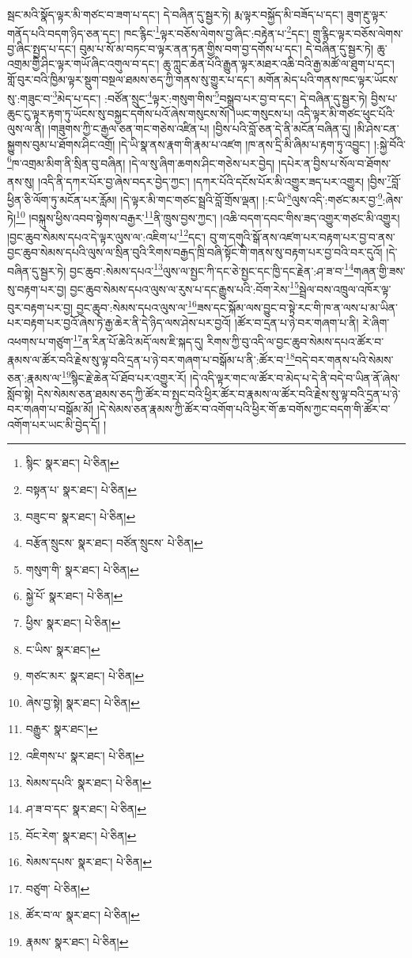 སྦང་མའི་སྣོད་ལྟར་མི་གཙང་བ་ཟག་པ་དང་། དེ་བཞིན་དུ་སྦྱར་ཏེ། རྨ་ལྟར་བསྐྱོད་མི་བཟོད་པ་དང་། ཟུག་རྔུ་ལྟར་གནོད་པའི་བདག་ཉིད་ཅན་དང་། ཁང་རྙིང་\footnote{སྙིང་  སྣར་ཐང་།  པེ་ཅིན། }ལྟར་བཅོས་ལེགས་བྱ་ཞིང་:བརྟེན་པ་\footnote{བསྟན་པ་  སྣར་ཐང་།  པེ་ཅིན། }དང་། གྲུ་རྙིང་ལྟར་བཅོས་ལེགས་བྱ་ཞིང་སྤྱད་པ་དང་། བུམ་པ་སོ་མ་བཏང་བ་ལྟར་ནན་ཏན་གྱིས་བག་བྱ་དགོས་པ་དང་། དེ་བཞིན་དུ་སྦྱར་ཏེ། ཆུ་འགྲམ་གྱི་ཤིང་ལྟར་གཡོ་ཞིང་འགུལ་བ་དང་། ཆུ་ཀླུང་ཆེན་པོའི་རྒྱུན་ལྟར་མཐར་འཆི་བའི་རྒྱ་མཚོ་ལ་ཐུག་པ་དང་། གློ་བུར་བའི་ཁྱིམ་ལྟར་སྡུག་བསྔལ་ཐམས་ཅད་ཀྱི་གནས་སུ་གྱུར་པ་དང་། མགོན་མེད་པའི་གནས་ཁང་ལྟར་ཡོངས་སུ་:གཟུང་བ་\footnote{བཟུང་བ་  སྣར་ཐང་།  པེ་ཅིན། }མེད་པ་དང་། :བཙོན་སྲུང་\footnote{བརྩོན་སྲུངས་  སྣར་ཐང་། བཙོན་སྲུངས་  པེ་ཅིན། }ལྟར་:གསུག་གིས་\footnote{གསུག་གི་  སྣར་ཐང་།  པེ་ཅིན། }བསྒྲུབ་པར་བྱ་བ་དང་། དེ་བཞིན་དུ་སྦྱར་ཏེ། བྱིས་པ་ཆུང་ངུ་ལྟར་རྟག་ཏུ་ཡོངས་སུ་བསྐྱང་དགོས་པའོ་ཞེས་གསུངས་སོ། །ཡང་གསུངས་པ། འདི་ལྟར་མི་གཙང་ཕུང་པོའི་ལུས་ལ་ནི། །གཟུགས་ཀྱི་ང་རྒྱལ་ཅན་གང་གཅེས་འཛིན་པ། །བྱིས་པའི་བློ་ཅན་དེ་ནི་མངོན་བཞིན་དུ། །མི་ཤེས་ངན་སྐྱུགས་བུམ་པ་ཐོགས་ཤིང་འགྲོ། །དེ་ཡི་སྣ་ནས་རྣག་གི་རྣམ་པ་འཛག །ཁ་ནས་དྲི་མི་ཞིམ་པ་རྟག་ཏུ་འབྱུང་། །:སྐྱེ་བོའི་\footnote{སྐྱེ་པོ་  སྣར་ཐང་།  པེ་ཅིན། }ཁ་འགྲམ་མིག་ནི་སྲིན་བུ་བཞིན། །དེ་ལ་སུ་ཞིག་ཆགས་ཤིང་གཅེས་པར་བྱེད། །དཔེར་ན་བྱིས་པ་སོལ་བ་ཐོགས་ནས་སུ། །འདི་ནི་དཀར་པོར་བྱ་ཞེས་བདར་བྱེད་ཀྱང་། །དཀར་པོའི་དངོས་པོར་མི་འགྱུར་ཟད་པར་འགྱུར། །བྱིས་\footnote{ཕྱིས་  སྣར་ཐང་།  པེ་ཅིན། }བློ་ཕྱིན་ཅི་ལོག་ཏུ་མངོན་པར་རློམ། །དེ་ལྟར་མི་གང་གཙང་སྦྲའི་བློ་གྲོས་ལྡན། །:ང་ཡི་\footnote{ང་ཡིས་  སྣར་ཐང་། }ལུས་འདི་:གཙང་མར་བྱ་\footnote{གཙང་མར་  སྣར་ཐང་།  པེ་ཅིན། }:ཞེས་ཏེ།\footnote{ཞེས་བྱ་སྟེ།  སྣར་ཐང་།  པེ་ཅིན། } །བསྐུས་ཕྱིས་འབབ་སྟེགས་བརྒྱར་\footnote{བརྒྱུར་  སྣར་ཐང་། }ནི་ཁྲུས་བྱས་ཀྱང་། །འཆི་བདག་དབང་གིས་ཟད་འགྱུར་གཙང་མི་འགྱུར། །བྱང་ཆུབ་སེམས་དཔའ་དེ་ལྟར་ལུས་ལ་:འཇིག་པ་\footnote{འཇིགས་པ་  སྣར་ཐང་།  པེ་ཅིན། }དང་། བུ་ག་དགུའི་སྒོ་ནས་འཛག་པར་བརྟག་པར་བྱ་བ་ནས་བྱང་ཆུབ་སེམས་དཔའི་ལུས་ལ་སྲིན་བུའི་རིགས་བརྒྱད་ཁྲི་བཞི་སྟོང་གི་གནས་སུ་བརྟག་པར་བྱ་བའི་བར་དུའོ། །དེ་བཞིན་དུ་སྦྱར་ཏེ། བྱང་ཆུབ་:སེམས་དཔའ་\footnote{སེམས་དཔའི་  སྣར་ཐང་།  པེ་ཅིན། }ལུས་ལ་སྤྱང་ཀི་དང་ཅེ་སྤྱང་དང་ཁྱི་དང་རྗེན་:ཤ་ཟ་བ་\footnote{ཤ་ཟ་བ་དང་  སྣར་ཐང་།  པེ་ཅིན། }གཞན་གྱི་ཟས་སུ་བརྟག་པར་བྱ། བྱང་ཆུབ་སེམས་དཔའ་ལུས་ལ་རུས་པ་དང་རྒྱུས་པའི་:བོག་རེས་\footnote{བོང་རེག་  སྣར་ཐང་།  པེ་ཅིན། }སྦྲེལ་བས་འཁྲུལ་འཁོར་ལྟ་བུར་བརྟག་པར་བྱ། བྱང་ཆུབ་:སེམས་དཔའ་ལུས་ལ་\footnote{སེམས་དཔས་  སྣར་ཐང་།  པེ་ཅིན། }ཟས་དང་སྐོམ་ལས་བྱུང་བ་སྟེ་རང་གི་ཁ་ན་ལས་པ་མ་ཡིན་པར་བརྟག་པར་བྱའོ་ཞེས་ཏེ་རྒྱ་ཆེར་ནི་དེ་ཉིད་ལས་ཤེས་པར་བྱའོ། །ཚོར་བ་དྲན་པ་ཉེ་བར་གཞག་པ་ནི། རེ་ཞིག་འཕགས་པ་གཙུག་\footnote{བཙུག་  པེ་ཅིན། }ན་རིན་པོ་ཆེའི་མདོ་ལས་ཇི་སྐད་དུ། རིགས་ཀྱི་བུ་འདི་ལ་བྱང་ཆུབ་སེམས་དཔའ་ཚོར་བ་རྣམས་ལ་ཚོར་བའི་རྗེས་སུ་ལྟ་བའི་དྲན་པ་ཉེ་བར་གཞག་པ་བསྒོམ་པ་ནི་:ཚོར་བ་\footnote{ཚོར་བ་ལ་  སྣར་ཐང་།  པེ་ཅིན། }བདེ་བར་གནས་པའི་སེམས་ཅན་:རྣམས་ལ་\footnote{རྣམས་  སྣར་ཐང་།  པེ་ཅིན། }སྙིང་རྗེ་ཆེན་པོ་ཐོབ་པར་འགྱུར་རོ། །དེ་འདི་ལྟར་གང་ལ་ཚོར་བ་མེད་པ་དེ་ནི་བདེ་བ་ཡིན་ནོ་ཞེས་སློབ་སྟེ། དེས་སེམས་ཅན་ཐམས་ཅད་ཀྱི་ཚོར་བ་སྤང་བའི་ཕྱིར་ཚོར་བ་རྣམས་ལ་ཚོར་བའི་རྗེས་སུ་ལྟ་བའི་དྲན་པ་ཉེ་བར་གཞག་པ་བསྒོམ་མོ། །དེ་སེམས་ཅན་རྣམས་ཀྱི་ཚོར་བ་འགོག་པའི་ཕྱིར་གོ་ཆ་བགོས་ཀྱང་བདག་གི་ཚོར་བ་འགོག་པར་ཡང་མི་བྱེད་དོ། །
